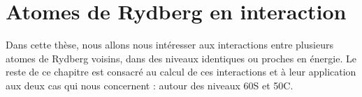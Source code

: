 
\section{Atomes de Rydberg en interaction}\label{sec:interacting_rydbergs}
Dans cette thèse, nous allons nous intéresser aux interactions entre plusieurs atomes de Rydberg voisins, dans des niveaux identiques ou proches en énergie.
Le reste de ce chapitre est consacré au calcul de ces interactions et à leur application aux deux cas qui nous concernent : autour des niveaux 60S et 50C.

